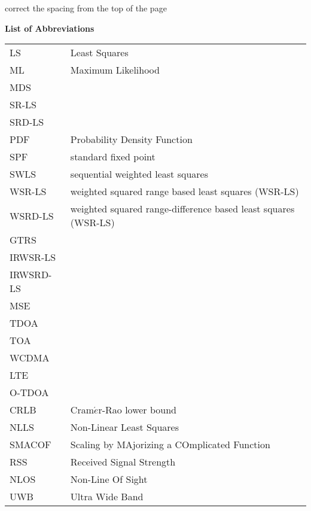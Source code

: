 \newpage
{}

\phantom{m}

correct the spacing from the top of the page

\begin{flushleft}
\begin{Huge}
\textbf{List of Abbreviations}
\end{Huge}
\end{flushleft}

\begin{table}[h]
\begin{tabular}{l l} 
LS & Least Squares \\
ML & Maximum Likelihood \\
MDS &  \\
SR-LS  & \\
SRD-LS & \\
PDF & Probability Density Function \\
SPF & standard fixed point\\
SWLS & sequential weighted least squares \\
WSR-LS & weighted squared range based least squares (WSR-LS)\\
WSRD-LS & weighted squared range-difference based least squares (WSR-LS)\\
GTRS & \\
IRWSR-LS & \\
IRWSRD-LS & \\
MSE & \\
TDOA & \\
TOA & \\
WCDMA & \\
LTE & \\
O-TDOA & \\
CRLB & Cram$\acute{e}$r-Rao  lower  bound \\
NLLS & Non-Linear Least Squares \\
SMACOF & Scaling by MAjorizing a COmplicated Function \\
RSS & Received Signal Strength \\
NLOS & Non-Line Of Sight \\
UWB & Ultra Wide Band \\
\end{tabular}
\end{table}
